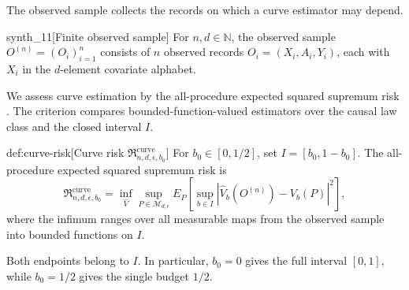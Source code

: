 The observed sample collects the records on which a curve estimator may depend.

\begin{definitionv}{synth_11}[Finite observed sample]
For \(n,d\in\mathbb N\), the observed sample \(O^{(n)}=(O_i)_{i=1}^n\) consists of \(n\) observed records \(O_i=(X_i,A_i,Y_i)\), each with \(X_i\) in the \(d\)-element covariate alphabet.
\end{definitionv}

We assess curve estimation by the all-procedure expected squared supremum risk . The criterion compares bounded-function-valued estimators over the causal law class and the closed interval \(I\).

\begin{definitionv}{def:curve-risk}[Curve risk $\mathfrak R_{n,d,\epsilon,b_0}^{\mathrm{curve}}$]
For \(b_0\in[0,1/2]\), set \(I=[b_0,1-b_0]\). The all-procedure expected squared supremum risk is
\[
\mathfrak R_{n,d,\epsilon,b_0}^{\mathrm{curve}}
=
\inf_{\widehat V}
\sup_{P\in\mathcal M_{d,\epsilon}}
E_P\!\left[
\sup_{b\in I}
\left|\widehat V_b(O^{(n)})-V_b(P)\right|^2
\right],
\]
where the infimum ranges over all measurable maps from the observed sample into bounded functions on \(I\).
\end{definitionv}

Both endpoints belong to \(I\). In particular, \(b_0=0\) gives the full interval \([0,1]\), while \(b_0=1/2\) gives the single budget \(1/2\).
